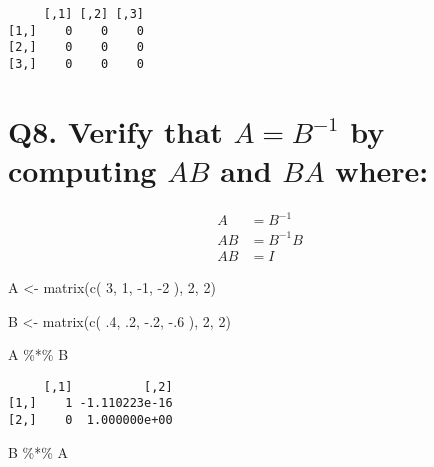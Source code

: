 \documentclass[
  letterpaper,
  DIV=11,
  numbers=noendperiod]{scrartcl}
\newenvironment{Shaded}{\begin{snugshade}}{\end{snugshade}}
\newcommand{\DecValTok}[1]{\textcolor[rgb]{0.68,0.00,0.00}{#1}}
\newcommand{\FunctionTok}[1]{\textcolor[rgb]{0.28,0.35,0.67}{#1}}
\newcommand{\NormalTok}[1]{\textcolor[rgb]{0.00,0.23,0.31}{#1}}
\newcommand{\OtherTok}[1]{\textcolor[rgb]{0.00,0.23,0.31}{#1}}
\newcommand{\SpecialCharTok}[1]{\textcolor[rgb]{0.37,0.37,0.37}{#1}}
\begin{document}
\begin{verbatim}
     [,1] [,2] [,3]
[1,]    0    0    0
[2,]    0    0    0
[3,]    0    0    0
\end{verbatim}

\hypertarget{q8.-verify-that-a-b-1-by-computing-ab-and-ba-where}{%
\section{\texorpdfstring{Q8. Verify that \(A = B^{-1}\) by computing
\(AB\) and \(BA\)
where:}{Q8. Verify that A = B\^{}\{-1\} by computing AB and BA where:}}\label{q8.-verify-that-a-b-1-by-computing-ab-and-ba-where}}

\[
\begin{aligned}
A &= B^{-1} \\
AB &= B^{-1}B \\
AB &= I
\end{aligned}
\]

\begin{Shaded}
\begin{Highlighting}[]
\NormalTok{A }\OtherTok{\textless{}{-}} \FunctionTok{matrix}\NormalTok{(}\FunctionTok{c}\NormalTok{(}
  \DecValTok{3}\NormalTok{, }\DecValTok{1}\NormalTok{,}
  \SpecialCharTok{{-}}\DecValTok{1}\NormalTok{, }\SpecialCharTok{{-}}\DecValTok{2}
\NormalTok{), }\DecValTok{2}\NormalTok{, }\DecValTok{2}\NormalTok{)}

\NormalTok{B }\OtherTok{\textless{}{-}} \FunctionTok{matrix}\NormalTok{(}\FunctionTok{c}\NormalTok{(}
\NormalTok{  .}\DecValTok{4}\NormalTok{, .}\DecValTok{2}\NormalTok{,}
  \SpecialCharTok{{-}}\NormalTok{.}\DecValTok{2}\NormalTok{, }\SpecialCharTok{{-}}\NormalTok{.}\DecValTok{6}
\NormalTok{), }\DecValTok{2}\NormalTok{, }\DecValTok{2}\NormalTok{)}

\NormalTok{A }\SpecialCharTok{\%*\%}\NormalTok{ B}
\end{Highlighting}
\end{Shaded}

\begin{verbatim}
     [,1]          [,2]
[1,]    1 -1.110223e-16
[2,]    0  1.000000e+00
\end{verbatim}

\begin{Shaded}
\begin{Highlighting}[]
\NormalTok{B }\SpecialCharTok{\%*\%}\NormalTok{ A}
\end{Highlighting}
\end{Shaded}
\end{document}
